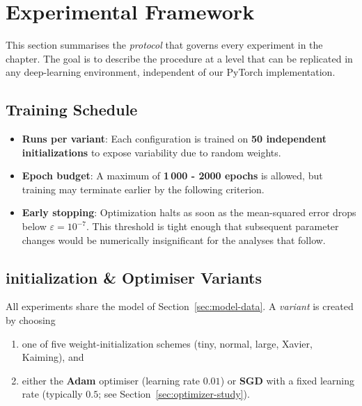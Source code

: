 ﻿%
\section{Experimental Framework}
\label{sec:abs1-framework}

This section summarises the \emph{protocol} that governs every experiment in
the chapter.  The goal is to describe the procedure at a level that can be
replicated in any deep-learning environment, independent of our PyTorch
implementation.

\subsection*{Training Schedule}

\begin{itemize}
  \item \textbf{Runs per variant}: Each configuration is trained
        on \textbf{50 independent initializations} to expose variability due
        to random weights.
  \item \textbf{Epoch budget}: A maximum of \textbf{1\,000 - 2000 epochs} is allowed, but training may
        terminate earlier by the following criterion.
  \item \textbf{Early stopping}: Optimization halts as soon as the
        mean-squared error drops below
        \(\displaystyle\varepsilon = 10^{-7}\).
        This threshold is tight enough that subsequent parameter changes would
        be numerically insignificant for the analyses that follow.
\end{itemize}

\subsection*{initialization \& Optimiser Variants}

All experiments share the model of Section~\ref{sec:model-data}.  
A \emph{variant} is created by choosing

\begin{enumerate}
  \item one of five weight-initialization schemes  
        (tiny, normal, large, Xavier, Kaiming), and
  \item either the \textbf{Adam} optimiser (learning rate \(0.01\))  
        or \textbf{SGD} with a fixed learning rate (typically \(0.5\); see
        Section~\ref{sec:optimizer-study}).
\end{enumerate}

